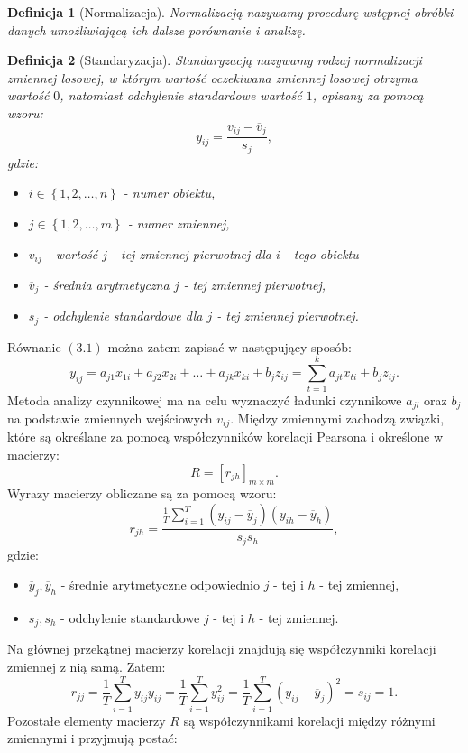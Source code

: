 \documentclass[12pt,a4paper]{report}
\newtheorem{df}{Definicja}[chapter]
\newcommand{\set}[1]{\left\lbrace {#1} \right\rbrace}
\begin{document}
\begin{df}[Normalizacja]
Normalizacją nazywamy procedurę wstępnej obróbki danych umożliwiającą ich dalsze porównanie i analizę.
\end{df}

\begin{df}[Standaryzacja]
Standaryzacją nazywamy rodzaj normalizacji zmiennej losowej, w którym wartość oczekiwana zmiennej losowej otrzyma wartość $0$, natomiast odchylenie standardowe wartość $1$, opisany za pomocą wzoru:
$$
y_{ij} = \frac{v_{ij}-\overline{v}_j}{s_j},
$$
gdzie:
\begin{itemize}
\item $i \in \set{1,2, \ldots , n}$ - numer obiektu, 
\item $j \in \set{1,2, \ldots , m}$ - numer zmiennej,
\item $v_{ij} $ - wartość $j$ - tej zmiennej pierwotnej dla $i$ - tego obiektu
\item $\overline{v}_j$ - średnia arytmetyczna $j$ - tej zmiennej pierwotnej,
\item $s_j$ - odchylenie standardowe dla  $j$ - tej zmiennej pierwotnej.
\end{itemize}
\end{df}
Równanie $(3.1)$ można zatem zapisać w następujący sposób:
$$
y_{ij}=a_{j1}x_{1i} + a_{j2}x_{2i} + \ldots + a_{jk}x_{ki} + b_jz_{ij} = \sum_{t=1}^{k} a_{jt}x_{ti} + b_jz_{ij}.
$$
Metoda analizy czynnikowej ma na celu wyznaczyć ładunki czynnikowe $a_{jl}$ oraz $b_j$ na podstawie zmiennych wejściowych $v_{ij}$. Między zmiennymi zachodzą związki, które są określane za pomocą współczynników korelacji Pearsona i określone w macierzy:
$$
R = [r_{jh}]_{m\times m}.
$$ 
Wyrazy macierzy obliczane są za pomocą wzoru:
$$
r_{jh} = \frac{\frac{1}{T}\sum_{i=1}^T(y_{ij}-\overline{y}_j)(y_{ih}-\overline{y}_h)}{s_js_h},
$$
gdzie:
\begin{itemize}
\item $\overline{y}_j, \overline{y}_h$ - średnie arytmetyczne odpowiednio $j$ - tej i $h$ - tej zmiennej,
\item $s_j, s_h$ - odchylenie standardowe $j$ - tej i $h$ - tej zmiennej.
\end{itemize}
Na głównej przekątnej macierzy korelacji znajdują się współczynniki korelacji zmiennej z nią samą. Zatem:
$$
r_{jj} = \frac{1}{T} \sum_{i=1}^{T} y_{ij} y_{ij} = \frac{1}{T} \sum_{i=1}^{T} y_{ij}^2 = \frac{1}{T} \sum_{i=1}^{T} (y_{ij}-\overline{y}_j)^2 = s_{ij} =1.
$$
Pozostałe elementy macierzy $R$ są współczynnikami korelacji między różnymi zmiennymi i przyjmują postać:
\end{document}
